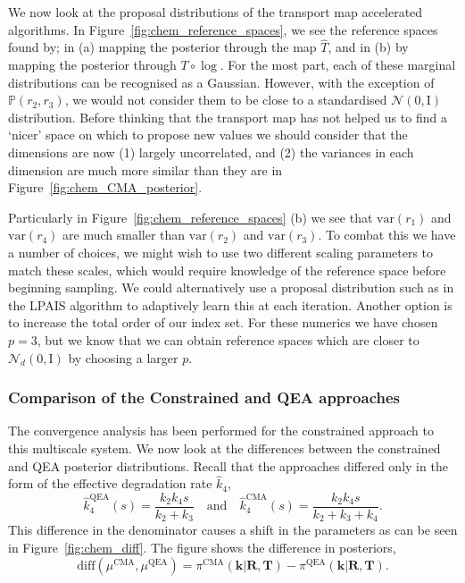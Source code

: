 \documentclass[final]{siamltex}
\begin{document}
We now look at the proposal distributions of the transport map accelerated algorithms. In Figure~\ref{fig:chem_reference_spaces}, we see the reference spaces found by; in (a) mapping the posterior through the map $\hat{T}$, and in (b) by mapping the posterior through $T\circ\log$. For the most part, each of these marginal distributions can be recognised as a Gaussian. However, with the exception of $\mathbb{P}(r_2,r_3)$, we would not consider them to be close to a standardised $\mathcal{N}(0, \text{I})$ distribution. Before thinking that the transport map has not helped us to find a `nicer' space on which to propose new values we should consider that the dimensions are now (1) largely uncorrelated, and (2) the variances in each dimension are much more similar than they are in Figure~\ref{fig:chem_CMA_posterior}.

Particularly in Figure~\ref{fig:chem_reference_spaces} (b) we see that $\text{var}(r_1)$ and $\text{var}(r_4)$ are much smaller than $\text{var}(r_2)$ and $\text{var}(r_3)$. To combat this we have a number of choices, we might wish to use two different scaling parameters to match these scales, which would require knowledge of the reference space before beginning sampling. We could alternatively use a proposal distribution such as in the LPAIS algorithm to adaptively learn this at each iteration. Another option is to increase the total order of our index set. For these numerics we have chosen $p=3$, but we know that we can obtain reference spaces which are closer to $\mathcal{N}_d(0, \text{I})$ by choosing a larger $p$.

\subsubsection{Comparison of the Constrained and QEA approaches}

The convergence analysis has been performed for the constrained approach to this multiscale system. We now look at the differences between the constrained and QEA posterior distributions. Recall that the approaches differed only in the form of the effective degradation rate $\hat{k}_4$,
\[
	\hat{k}_4^{\text{QEA}}(s) = \frac{k_2k_4s}{k_2+k_3} \quad \text{and} \quad \hat{k}_4^{\text{CMA}}(s) = \frac{k_2k_4s}{k_2+k_3+k_4}.
\]
This difference in the denominator causes a shift in the parameters as can be seen in Figure~\ref{fig:chem_diff}. The figure shows the difference in posteriors,
\begin{equation}\label{eqn:chem_diff}
	\text{diff}(\mu^{\text{CMA}}, \mu^{\text{QEA}}) = \pi^{\text{CMA}}(\mathbf{k}|\mathbf{R},\mathbf{T}) - \pi^{\text{QEA}}(\mathbf{k}|\mathbf{R},\mathbf{T}).
\end{equation}
\end{document}
